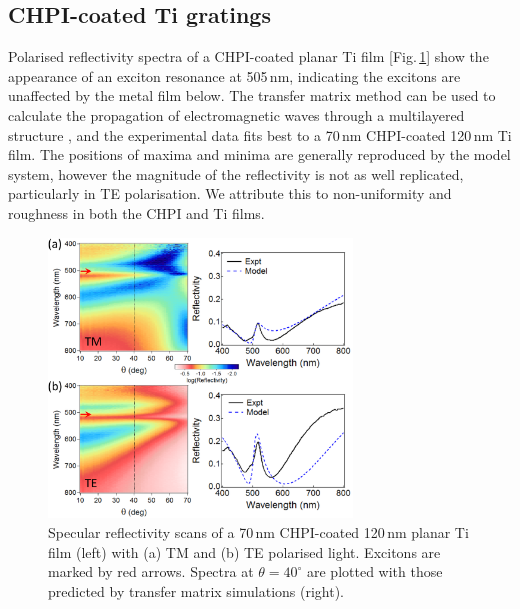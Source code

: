 \subsection{CHPI-coated Ti gratings}
Polarised reflectivity spectra of a CHPI-coated planar Ti film [Fig.\,\ref{7Fig5}] show the appearance of an exciton resonance at 505\,nm, indicating the excitons are unaffected by the metal film below. %
The transfer matrix method can be used to calculate the propagation of electromagnetic waves through a multilayered structure \cite{Born1999}, and the experimental data fits best to a 70\,nm CHPI-coated 120\,nm Ti film. The positions of maxima and minima are generally reproduced by the model system, however the magnitude of the reflectivity is not as well replicated, particularly in TE polarisation. We attribute this to non-uniformity and roughness in both the CHPI and Ti films. %
\begin{figure}[h!] 
\centering    
\includegraphics[width=0.72\textwidth]{Fig5}
\caption[(a) TM and (b) TE polarised reflectivity scans of 70\,nm CHPI film on 120\,nm planar Ti film compared to transfer matrix simulations.]{Specular reflectivity scans of a 70\,nm CHPI-coated 120\,nm planar Ti film (left) with (a) TM and (b) TE polarised light. Excitons are marked by red arrows. Spectra at $\theta=40^{\circ}$ are plotted with those predicted by transfer matrix simulations (right).}
\label{7Fig5}
\end{figure}

